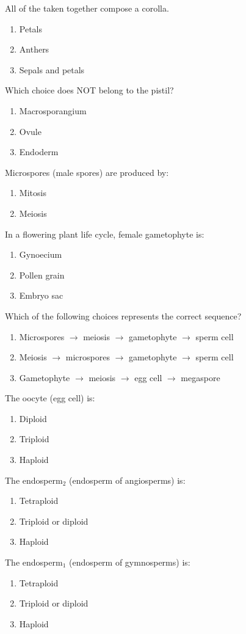 \documentclass[letterpaper]{article}
\renewcommand{\_}{\mbox{}\hrulefill}
\newcommand{\be}{\begin{enumerate}}
\newcommand{\ee}{\end{enumerate}}
\begin{document}
\begin{multicols}{2}
\item All of the \_ taken together compose a corolla.
	\be
	\item Petals
	\item Anthers
	\item Sepals and petals
	\ee

\item Which choice does NOT belong to the pistil?
	\be
	\item Macrosporangium
	\item Ovule
	\item Endoderm
	\ee

\item Microspores (male spores) are produced by:
	\be
	\item Mitosis
	\item Meiosis
	\ee

\item In a flowering plant life cycle, female gametophyte is:
	\be
	\item Gynoecium
	\item Pollen grain
	\item Embryo sac
	\ee

\item Which of the following choices represents the correct sequence?
	\be
	\item Microspores $\rightarrow$ meiosis $\rightarrow$ gametophyte $\rightarrow$ sperm cell
	\item Meiosis $\rightarrow$ microspores $\rightarrow$ gametophyte $\rightarrow$ sperm cell
	\item Gametophyte $\rightarrow$ meiosis $\rightarrow$ egg cell $\rightarrow$ megaspore
	\ee

\item The oocyte (egg cell) is:
	\be
	\item Diploid
	\item Triploid
	\item Haploid
	\ee

\item The endosperm$_2$ (endosperm of angiosperms) is:
	\be
	\item Tetraploid
	\item Triploid or diploid
	\item Haploid
	\ee

\item The endosperm$_1$ (endosperm of gymnosperms) is:
	\be
	\item Tetraploid
	\item Triploid or diploid
	\item Haploid
	\ee


\end{multicols}
\end{document}
